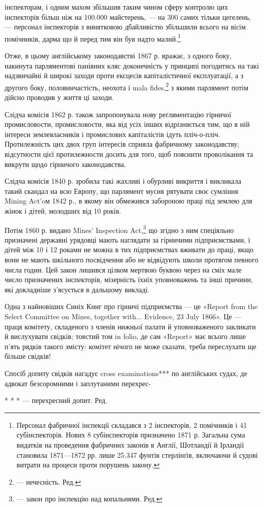 інспекторам, і одним махом збільшив таким чином сферу контролю
цих інспекторів більш ніж на 100.000 майстерень, — на 300 самих
тільки цегелень, — персонал інспекторів з винятковою дбайливістю
збільшили всього на вісім помічників, дарма що й перед
тим він був надто малий.\footnote{
Персонал фабричної інспекції складався з 2 інспекторів, 2 помічників
і 41 субінспекторів. Нових 8 субінспекторів призначено 1871 р.
Загальна сума видатків на проведення фабричних законів в Англії,
Шотландії й Ірландії становила 1871—1872 рр. лише 25.347 фунтів стерлінґів,
включаючи й судові витрати на процеси проти порушень закону.
}

Отже, в цьому англійському законодавстві 1867 р. вражає,
з одного боку, накинута парляментові панівних кляс доконечність
у принципі погодитись на такі надзвичайні й широкі заходи
проти ексцесів капіталістичної експлуатації, а з другого боку,
половинчастість, неохота і mala fides,\footnote*{
— нечесність. Ред.
} з якими парлямент
потім дійсно проводив у життя ці заходи.

Слідча комісія 1862 р. також запропонувала нову реґляментацію
гірничої промисловости, промисловости, яка від усіх інших
відрізняється тим, що в ній інтереси землевласників і промислових
капіталістів ідуть пліч-о-пліч. Протилежність цих двох
груп інтересів сприяла фабричному законодавству; відсутности
цієї протилежности досить для того, щоб пояснити проволікання
та викрути щодо гірничого законодавства.

Слідча комісія 1840 р. зробила такі жахливі і обурливі викриття
і викликала такий скандал на всю Европу, що парлямент
мусив рятувати своє сумління Mining Act’oм 1842 р., в якому
він обмежився забороною праці під землею для жінок і дітей,
молодших від 10 років.

Потім 1860 р. видано Mines’ Inspection Act,\footnote*{
— закон про інспекцію над копальнями. Ред.
} що згідно з ним
спеціяльно призначені державні урядовці мають наглядати за гірничими
підприємствами, і дітей між 10 і 12 роками не можна в
тих підприємствах вживати до праці, якщо вони не мають шкільного
посвідчення або не відвідують школи протягом певного
числа годин. Цей закон лишився цілком мертвою буквою через
на сміх мале число призначених інспекторів, мізерність їхніх
уповноважень та інші причини, які докладніше з’ясується в
дальшому викладі.

Одна з найновіших Синіх Книг про гірничі підприємства —
це «Report from the Select Committee on Mines, together with...
Evidence, 23 July 1866». Це — праця комітету, складеного з
членів нижньої палати й уповноваженого закликати й вислухувати
свідків; товстий том in folio, де сам «Report» має всього
лише п’ять рядків такого змісту: комітет нічого не може сказати,
треба переслухати ще більше свідків!

Спосіб допиту свідків нагадує cross examinations*** по англійських
судах, де адвокат безсоромними і заплутаними перехрес-

* * * — перехресний допит. Ред.
